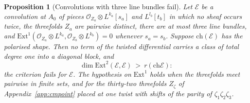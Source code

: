 \documentclass[11pt,reqno]{amsart}
\numberwithin{equation}{section}
\theoremstyle{plain}
\newtheorem{proposition}[theorem]{Proposition}
\theoremstyle{definition}
\newcommand{\Ext}{\mathrm{Ext}}
\newcommand{\ch}{\mathrm{ch}}
\begin{document}
\begin{proposition}[Convolutions with three line bundles fail]\label{prop:separated}
Let $\mathcal{E}$ be a convolution at $A_{0}$ of pieces $\mathcal{O}_{Z_{a}}\otimes L^{k_{a}}[s_{a}]$ and $L^{l_{b}}[t_{b}]$ in which no sheaf occurs twice, the threefolds $Z_{a}$ are pairwise distinct, there are at most three line bundles, and $\Ext^{1}(\mathcal{O}_{Z_{a}}\otimes L^{k_{a}},\mathcal{O}_{Z_{b}}\otimes L^{k_{b}})=0$ whenever $s_{a}=s_{b}$. Suppose $\ch(\mathcal{E})$ has the polarised shape. Then no term of the twisted differential carries a class of total degree one into a diagonal block, and
\[
\dim\Ext^{2}(\mathcal{E},\mathcal{E})\ >\ r(\ch\mathcal{E}):
\]
the criterion fails for $\mathcal{E}$. The hypothesis on $\Ext^{1}$ holds when the threefolds meet pairwise in finite sets, and for the thirty-two threefolds $Z_{\zeta}$ of Appendix~\ref{app:cmpoint} placed at one twist with shifts of the parity of $\zeta_{1}\zeta_{2}\zeta_{3}$.
\end{proposition}
\end{document}
